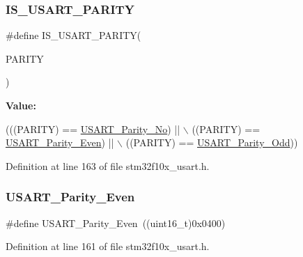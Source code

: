 \subsubsection{\texorpdfstring{I\+S\+\_\+\+U\+S\+A\+R\+T\+\_\+\+P\+A\+R\+I\+TY}{IS\_USART\_PARITY}}
{\footnotesize\ttfamily \#define I\+S\+\_\+\+U\+S\+A\+R\+T\+\_\+\+P\+A\+R\+I\+TY(\begin{DoxyParamCaption}\item[{}]{P\+A\+R\+I\+TY }\end{DoxyParamCaption})}

{\bfseries Value\+:}
\begin{DoxyCode}
(((PARITY) == \hyperlink{group___u_s_a_r_t___parity_gab9deebcb0a859360dfec85074abaa3aa}{USART\_Parity\_No}) || \(\backslash\)
                                 ((PARITY) == \hyperlink{group___u_s_a_r_t___parity_ga62193247d36fffe982e159c1f246271e}{USART\_Parity\_Even}) || \(\backslash\)
                                 ((PARITY) == \hyperlink{group___u_s_a_r_t___parity_gafcd68937a6b4b8ffff8f96e68d6a5ecd}{USART\_Parity\_Odd}))
\end{DoxyCode}


Definition at line 163 of file stm32f10x\+\_\+usart.\+h.

\mbox{\label{group___u_s_a_r_t___parity_ga62193247d36fffe982e159c1f246271e}} 
\subsubsection{\texorpdfstring{U\+S\+A\+R\+T\+\_\+\+Parity\+\_\+\+Even}{USART\_Parity\_Even}}
{\footnotesize\ttfamily \#define U\+S\+A\+R\+T\+\_\+\+Parity\+\_\+\+Even~((uint16\+\_\+t)0x0400)}



Definition at line 161 of file stm32f10x\+\_\+usart.\+h.

\mbox{\label{group___u_s_a_r_t___parity_gab9deebcb0a859360dfec85074abaa3aa}} 
